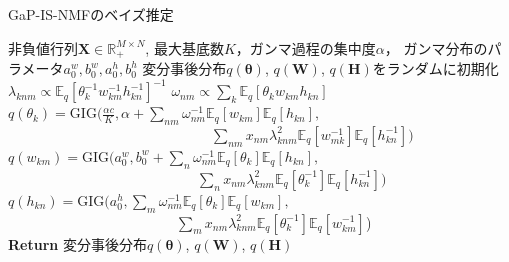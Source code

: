 \begin{algorithm}[t]
\caption{GaP-IS-NMFのベイズ推定}
\label{is-nmf-vb}
\begin{algorithmic}[1]
\Require 非負値行列$\bm{X} \in \mathbb{R}_+^{M \times N}$, 最大基底数$K$，ガンマ過程の集中度$\alpha$，
ガンマ分布のパラメータ$a_0^w,b_0^w,a_0^h,b_0^h$
\State 変分事後分布$q(\bm\theta)$, $q(\bm{W})$, $q(\bm{H})$をランダムに初期化
\State $\lambda_{knm} \propto \mathbb{E}_{q}[\theta_k^{-1} w_{km}^{-1} h_{kn}^{-1}]^{-1}$
\State $\omega_{nm} \propto \sum_k \mathbb{E}_{q}[\theta_k w_{km} h_{kn}]$
\State $\textstyle q(\theta_k)
= \mbox{GIG}(\frac{\alpha c}{K}, 
\alpha + \sum_{nm} \omega_{nm}^{-1} \mathbb{E}_{q}\!\left[w_{km}\right] \mathbb{E}_{q}\!\left[h_{kn}\right],$\\
\ \ \ \ \ \ \ \ \ \ \ \ \ \ \ \ \ \ \ \ \ \ \ \ \ \ \ \ \
$\sum_{nm} x_{nm} \lambda_{knm}^2 \mathbb{E}_{q}\!\left[w_{mk}^{-1}\right] \mathbb{E}_{q}\!\left[h_{kn}^{-1}\right])$
\State $\textstyle q(w_{km})
= \mbox{GIG}(a_0^w, 
b_0^w + \sum_{n} \omega_{nm}^{-1} \mathbb{E}_{q}\!\left[\theta_k\right] \mathbb{E}_{q}\!\left[h_{kn}\right],$\\
\ \ \ \ \ \ \ \ \ \ \ \ \ \ \ \ \ \ \ \ \ \ \ \ \ \ \ 
$\sum_{n} x_{nm} \lambda_{knm}^2 \mathbb{E}_{q}\!\left[\theta_k^{-1}\right] \mathbb{E}_{q}\!\left[h_{kn}^{-1}\right])$
\State $\textstyle q(h_{kn})
= \mbox{GIG}(a_0^h, 
\sum_{m} \omega_{nm}^{-1} \mathbb{E}_{q}\!\left[\theta_k\right] \mathbb{E}_{q}\!\left[w_{km}\right],$\\
\ \ \ \ \ \ \ \ \ \ \ \ \ \ \ \ \ \ \ \ \ \ \ \
$\sum_{m} x_{nm} \lambda_{knm}^2 \mathbb{E}_{q}\!\left[\theta_k^{-1}\right] \mathbb{E}_{q}\!\left[w_{km}^{-1}\right]$)
\EndWhile\\
{\bf Return} 変分事後分布$q(\bm\theta)$, $q(\bm{W})$, $q(\bm{H})$
\end{algorithmic}
\end{algorithm}

